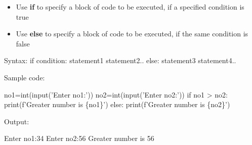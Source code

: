 \setlength{\columnsep}{3pt}
\begin{flushleft}
	
	\begin{itemize}
		\item Use \textbf{if} to specify a block of code to be executed, if a specified condition is true
		\item Use \textbf{else} to specify a block of code to be executed, if the same condition is false
	\end{itemize}
	
	
	\begin{tcolorbox}[breakable,notitle,boxrule=1pt,colback=pink,colframe=pink]
		\color{black}
		\font=8pt
		Syntax: 
		\newline
		if condition:
 \newline
		\hphantom{} \hphantom{}  statement1 \newline
		\hphantom{} \hphantom{}  statement2.. \newline
		else: \newline
		\hphantom{} \hphantom{}  statement3 \newline
		\hphantom{} \hphantom{}  statement4..
		\font=4pt
	\end{tcolorbox}
	
	Sample code:
	\begin{tcolorbox}[breakable,notitle,boxrule=-0pt,colback=code,colframe=code]
		\color{white}
		\font=8pt
		no1=int(input('Enter no1:')) \newline
		no2=int(input('Enter no2:')) \newline
		\newline
		if no1 > no2: \newline
		\hphantom{} \hphantom{} print(f'Greater number is \{no1\}') \newline
		else: \newline
		\hphantom{} \hphantom{} print(f'Greater number is \{no2\}')
		\font=4pt
	\end{tcolorbox}
	
	Output:
	\begin{tcolorbox}[breakable,notitle,boxrule=-0pt,colback=output,colframe=output]
		\color{black}
		Enter no1:34 \newline
		Enter no2:56 \newline
		Greater number is 56 \newline
		\font=4pt
	\end{tcolorbox}
	
	
	
	
	
\end{flushleft}

\newpage

